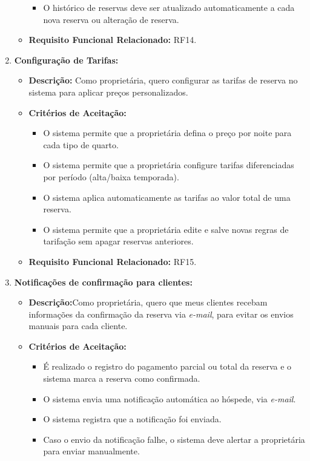 \documentclass[
	12pt,				%
	openany,			%
	twoside,			%
	a4paper,			%
	english,			%
	french,				%
	spanish,			%
	brazil				%
	]{abntex2}
\begin{document}
\begin{enumerate}[label=\textbf{\arabic*.}]
\begin{itemize}
\begin{itemize}
	 		\item O histórico de reservas deve ser atualizado automaticamente a cada nova reserva ou alteração de reserva.
	 	\end{itemize}
	 	\item \textbf{Requisito Funcional Relacionado:} RF14.
	 \end{itemize} 
	 \vspace{2cm}
	  \item \textbf{Configuração de Tarifas:}
	 \begin{itemize}
	 	\item \textbf{Descrição:} Como proprietária, quero configurar as tarifas de reserva no sistema para aplicar preços personalizados.
	 	\item \textbf{Critérios de Aceitação:}
	 	\begin{itemize}
	 		\item O sistema permite que a proprietária defina o preço por noite para cada tipo de quarto.
	 		\item O sistema permite que a proprietária configure tarifas diferenciadas por período (alta/baixa temporada).
	 		\item O sistema aplica automaticamente as tarifas ao valor total de uma reserva.
	 		\item O sistema permite que a proprietária edite e salve novas regras de tarifação sem apagar reservas anteriores.
	 	\end{itemize}
	 	\item \textbf{Requisito Funcional Relacionado:} RF15.
	 \end{itemize} 
	  \item \textbf{Notificações de confirmação para clientes:}
	 \begin{itemize}
	 	\item \textbf{Descrição:}Como proprietária, quero que meus clientes recebam informações da confirmação da reserva via \textit{e-mail}, para evitar os envios manuais para cada cliente. 
	 	\item \textbf{Critérios de Aceitação:}
	 	\begin{itemize}
	 		\item É realizado o registro do pagamento parcial ou total da reserva e o sistema marca a reserva como confirmada.
	 		\item O sistema envia  uma notificação automática ao hóspede, via \textit{e-mail}.
	 		\item O sistema registra que a notificação foi enviada.
	 		\item Caso o envio da notificação falhe, o sistema deve alertar a proprietária para enviar manualmente.

\end{itemize}
\end{itemize}
\end{enumerate}
\end{document}

